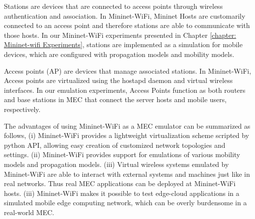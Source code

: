 Stations are devices that are connected to access points through wireless authentication and association. 
In Mininet-WiFi, Mininet Hosts are customarily connected to an access point and therefore stations are able to communicate with those hosts. In our Mininet-WiFi experiments presented in Chapter \ref{chapter: Mininet-wifi Experiments}, stations are implemented as a simulation for mobile devices, which are configured with propagation models and mobility models. 

Access points (AP) are devices that manage associated stations. In Mininet-WiFi, Access points are virtualized using the hostapd daemon and virtual wireless interfaces. In our emulation experiments, Access Points function as both routers and base stations in MEC that connect the server hosts and mobile users, respectively.

The advantages of using Mininet-WiFi as a MEC emulator can be summarized as follows, (i) Mininet-WiFi provides a lightweight virtualization scheme scripted by python API, allowing easy creation of customized network topologies and settings. (ii) Mininet-WiFi provides support for emulations of various mobility models and propagation models. (iii) Virtual wireless systems emulated by Mininet-WiFi are able to interact with external systems and machines just like in real networks. Thus real MEC applications can be deployed at Mininet-WiFi hosts. (iii) Mininet-WiFi makes it possible to test edge-cloud applications in a simulated mobile edge computing network, which can be overly burdensome in a real-world MEC.



